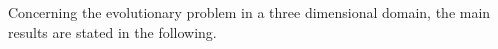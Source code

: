 \documentclass[11pt,reqno]{amsart}
\theoremstyle{remark}
\newtheorem{remark}[theorem]{Remark}
\def\n{\textbf{\textit{n}}}
\def\div{\mathrm{div}}
\numberwithin{equation}{section}
\newcommand{\uloc}{\operatorname{uloc}}
\begin{document}
Concerning the evolutionary problem in a three dimensional domain, the main results are stated in the following.
\end{document}
